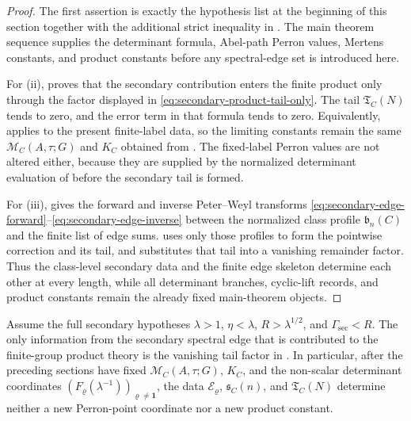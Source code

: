 \begin{proof}
  The first assertion is exactly the hypothesis list at the beginning of
  this section together with the additional strict inequality in
  .  The main theorem sequence supplies
  the determinant formula, Abel-path Perron values, Mertens constants, and
  product constants before any spectral-edge set is introduced here.

  For (ii),  proves that the
  secondary contribution enters the finite product only through the factor
  displayed in \eqref{eq:secondary-product-tail-only}.  The tail
  \(\mathfrak T_C(N)\) tends to zero, and the error term in that formula
  tends to zero.  Equivalently,
   applies to the present
  finite-label data, so the limiting constants remain the same
  \(\mathcal M_C(A,\tau;G)\) and \(K_C\) obtained from
  .  The
  fixed-label Perron values are not altered either, because they are
  supplied by the normalized determinant evaluation of
   before the secondary tail is
  formed.

  For (iii),  gives the forward and
  inverse Peter--Weyl transforms
  \eqref{eq:secondary-edge-forward}--\eqref{eq:secondary-edge-inverse}
  between the normalized class profile \(\mathfrak b_n(C)\) and the finite
  list of edge sums.   uses only
  those profiles to form the pointwise correction and its tail, and
   substitutes that tail into a
  vanishing remainder factor.  Thus the class-level secondary data and the
  finite edge skeleton determine each other at every length, while all
  determinant branches, cyclic-lift records, and product constants remain
  the already fixed main-theorem objects.
\end{proof}

\begin{corollary}
  \label{cor:secondary-only-exported-consequence}
  Assume the full secondary hypotheses \(\lambda>1\),
  \(\eta<\lambda\), \(R>\lambda^{1/2}\), and
  \(\Gamma_{\mathrm{sec}}<R\).  The only
  information from the secondary spectral edge that is contributed to the
  finite-group product theory is the vanishing tail factor in
  .  In particular, after the
  preceding sections have fixed \(\mathcal M_C(A,\tau;G)\), \(K_C\), and the
  non-scalar determinant coordinates
  \((F_\varrho(\lambda^{-1}))_{\varrho\ne\mathbf1}\), the data
  \(\mathcal E_\varrho\), \(\mathfrak s_C(n)\), and
  \(\mathfrak T_C(N)\) determine neither a new Perron-point coordinate nor a
  new product constant.

\end{corollary}

